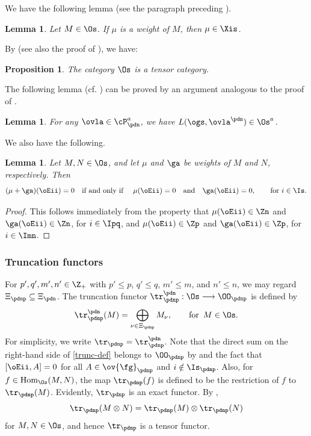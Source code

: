 \documentclass[11pt, reqno]{amsart}
\newtheorem{lem}[thm]{Lemma}
\newtheorem{prop}[thm]{Proposition}
\theoremstyle{definition}
\theoremstyle{remark}
\numberwithin{equation}{section}
\begin{document}
We have the following lemma (see the paragraph preceding \cite[Theorem 6.4]{CW}).
\begin{lem} \label{weight-Xi}
Let $M \in \Os$. If $\mu$ is a weight of $M$, then $\mu \in \Xis$.
\end{lem}

By \cite[Theorem 3.27 and Theorem 6.4]{CW} (see also the proof of \cite[Theorem 6.2.2]{Lus}), we have:

\begin{prop} \label{tensor-cat}
The category $\Os$ is a tensor category.
\end{prop}


The following lemma (cf. \cite[Lemma 4.1]{CLW12}) can be proved by an argument analogous to the proof of \cite[Lemma 3.1]{CLW11}.

\begin{lem} \label{verma-Os}
For any $\ovla \in \cP_\pdn^a$, we have $L(\ogs, \ovla^\pdn) \in \Os^a$.
\end{lem}

We also have the following.

\begin{lem}\label{weight=0}
 Let $M, N \in \Os$, and let $\mu$ and $\ga$ be weights of $M$ and $N$, respectively. Then
$$
(\mu+\ga)(\oEii)=0\quad\mbox{if and only if }\quad \mu(\oEii)=0 \quad \text{and} \quad \ga(\oEii)=0,\qquad
\mbox{for $i \in \Is$.}
$$
\end{lem}

\begin{proof}
This follows immediately from the property that $\mu(\oEii)\in \Zn$ and $\ga(\oEii)\in \Zn$, for $i \in \Ipq$, and $\mu(\oEii) \in \Zp$ and $\ga(\oEii) \in \Zp$, for $i \in \Imn$.
\end{proof}

\subsubsection{Truncation functors}\label{tr}
For $p', q', m', n' \in \Z_+$ with
$p' \le p$, $q' \le q$, $m' \le m$, and $n' \le n$,
we may regard $\Xi_\pdnp \subseteq \Xi_\pdn$.
The truncation functor
$\tr^\pdn_\pdnp: \Os \longrightarrow \OO_\pdnp$ is defined by
\begin{equation} \label{trunc-def}
\tr^\pdn_\pdnp(M)=\bigoplus_{\nu \in \Xi_\pdnp}M_{\nu}, \qquad \mbox{for $\, M\in \Os$}.
\end{equation}
For simplicity, we write $\tr_\pdnp=\tr^\pdn_\pdnp$.
Note that the direct sum on the right-hand side of \eqref{trunc-def} belongs to $\OO_\pdnp$
by \cite[Lemma 6.1]{CLW12} and the fact that
$[\oEii, A]=0$ for all $A \in \ov{\fg}_\pdnp$
and $i \notin \Is_\pdnp$.
Also, for $f \in {\rm Hom}_{\Os}(M, N)$,
the map
$\tr_\pdnp(f)$ is defined to be the restriction of
$f$ to $\tr_\pdnp(M)$.
Evidently, $\tr_\pdnp$ is an exact functor. By , $$\tr_\pdnp(M\otimes N)=\tr_\pdnp(M)\otimes \tr_\pdnp(N)$$
for $M, N \in \Os$, and hence 	$\tr_\pdnp$ is a tensor functor.
\end{document}
